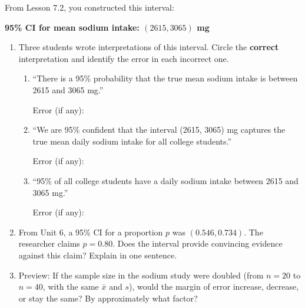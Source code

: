 \documentclass[10pt]{article}
\begin{document}
\namedateperiod

\vspace{0.15in}

From Lesson 7.2, you constructed this interval:\\[4pt]
\centerline{\textbf{95\% CI for mean sodium intake: $(2615, 3065)$ mg}}

\begin{enumerate}

  \item Three students wrote interpretations of this interval. Circle the
        \textbf{correct} interpretation and identify the error in each incorrect one.

        \begin{enumerate}[label=\Alph*.]
          \item ``There is a 95\% probability that the true mean sodium intake is
                between 2615 and 3065 mg.''

                Error (if any): 

          \item ``We are 95\% confident that the interval (2615, 3065) mg captures
                the true mean daily sodium intake for all college students.''

                Error (if any): 

          \item ``95\% of all college students have a daily sodium intake between
                2615 and 3065 mg.''

                Error (if any): 
        \end{enumerate}

  \item From Unit 6, a 95\% CI for a proportion $p$ was $(0.546, 0.734)$. The researcher
        claims $p = 0.80$. Does the interval provide convincing evidence against this claim?
        Explain in one sentence.


  \item Preview: If the sample size in the sodium study were doubled (from $n = 20$ to
        $n = 40$, with the same $\bar x$ and $s$), would the margin of error increase,
        decrease, or stay the same? By approximately what factor?


\end{enumerate}
\end{document}
